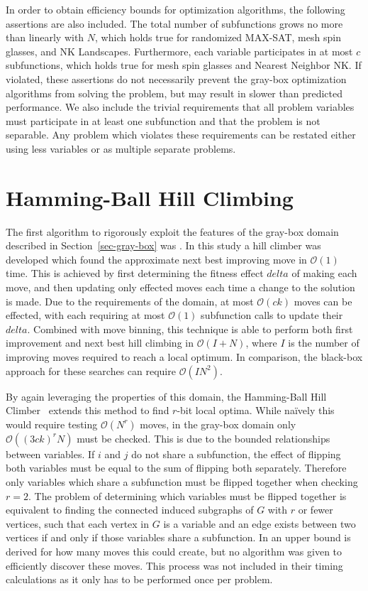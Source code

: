 \documentclass{sig-alternate}
\newcommand{\BigO}[1]{$\mathcal{O}{(#1)}$}
\begin{document}
In order to obtain efficiency bounds for optimization algorithms, the following
assertions are also included. The total number of subfunctions grows no more than
linearly with $N$, which holds true for randomized MAX-SAT, mesh spin glasses, and NK Landscapes.
Furthermore, each variable participates in at most $c$ subfunctions, which holds true
for mesh spin glasses and Nearest Neighbor NK. If violated, these assertions do not
necessarily prevent the gray-box optimization algorithms from solving the problem, but may result
in slower than predicted performance.
We also include the trivial requirements that all problem variables must participate
in at least one subfunction and that the problem is not separable. Any problem which
violates these requirements can be restated either using less variables or as multiple separate problems.

\section{Hamming-Ball Hill Climbing}
\label{sec-hamming}
The first algorithm to rigorously exploit the features of the gray-box domain
described in Section~\ref{sec-gray-box} was \cite{whitley:2013:greedy}. In this study
a hill climber was developed which found the approximate next best improving move in \BigO{1} time.
This is achieved by first determining the fitness effect $delta$ of making each move, and then updating
only effected moves each time a change to the solution is made. Due to the requirements of the domain,
at most \BigO{ck} moves can be effected, with each requiring at most \BigO{1} subfunction calls
to update their $delta$. Combined with move binning, this technique is able to perform both
first improvement and next best hill climbing in \BigO{I+N}, where $I$ is the number of improving
moves required to reach a local optimum. In comparison, the black-box approach for these searches can require
\BigO{IN^2}.

By again leveraging the properties of this domain, the Hamming-Ball Hill Climber~\cite{chicano:2014:ball} extends this
method to find $r$-bit local optima. While na\"ively this would require testing \BigO{N^r} moves, in the gray-box domain only
\BigO{(3ck)^rN} must be checked. This is due to the bounded relationships between variables.
If $i$ and $j$ do not share a subfunction, the effect of flipping both variables
must be equal to the sum of flipping both separately. Therefore only variables which share
a subfunction must be flipped together when checking $r=2$. The problem of determining
which variables must be flipped together is equivalent to finding the connected induced
subgraphs of $G$ with $r$ or fewer vertices, such that each vertex in $G$ is a variable
and an edge exists between two vertices if and only if those variables share a subfunction.
In \cite{chicano:2014:ball} an upper bound is derived for how many moves this could create,
but no algorithm was given to efficiently discover these moves. This process was not included
in their timing calculations as it only has to be performed once per problem.
\end{document}
